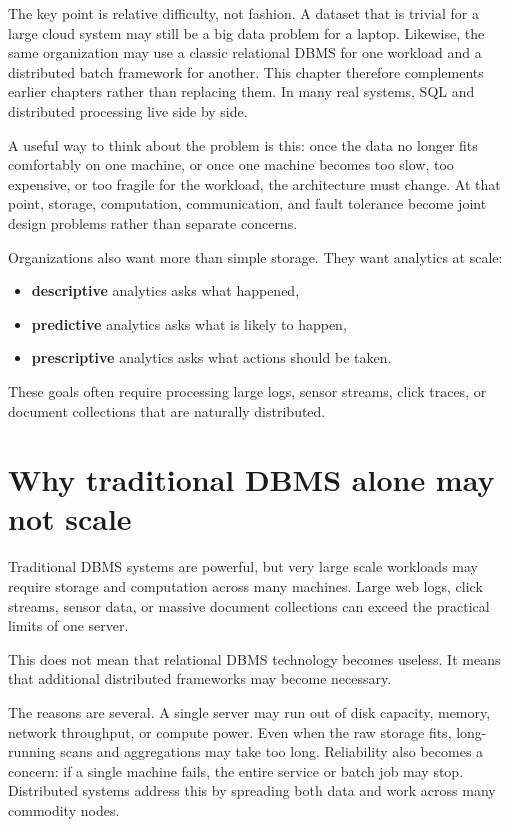 \documentclass[11pt,a4paper,openany]{book}
\begin{document}
The key point is relative difficulty, not fashion. A dataset that is trivial for a large cloud system may still be a big data problem for a laptop. Likewise, the same organization may use a classic relational DBMS for one workload and a distributed batch framework for another. This chapter therefore complements earlier chapters rather than replacing them. In many real systems, SQL and distributed processing live side by side.

A useful way to think about the problem is this: once the data no longer fits comfortably on one machine, or once one machine becomes too slow, too expensive, or too fragile for the workload, the architecture must change. At that point, storage, computation, communication, and fault tolerance become joint design problems rather than separate concerns.

Organizations also want more than simple storage. They want analytics at scale:
\begin{itemize}
\item \textbf{descriptive} analytics asks what happened,
\item \textbf{predictive} analytics asks what is likely to happen,
\item \textbf{prescriptive} analytics asks what actions should be taken.
\end{itemize}
These goals often require processing large logs, sensor streams, click traces, or document collections that are naturally distributed.

\section{Why traditional DBMS alone may not scale}
Traditional DBMS systems are powerful, but very large scale workloads may require storage and computation across many machines. Large web logs, click streams, sensor data, or massive document collections can exceed the practical limits of one server.

This does not mean that relational DBMS technology becomes useless. It means that additional distributed frameworks may become necessary.

The reasons are several. A single server may run out of disk capacity, memory, network throughput, or compute power. Even when the raw storage fits, long-running scans and aggregations may take too long. Reliability also becomes a concern: if a single machine fails, the entire service or batch job may stop. Distributed systems address this by spreading both data and work across many commodity nodes.
\end{document}
